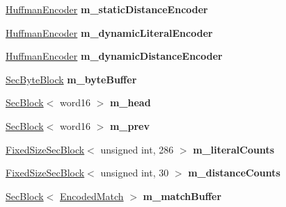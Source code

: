 \begin{DoxyCompactItemize}
\item 
\hypertarget{class_deflator_a3ca3308982b779fb60d9d3b6b10f0d02}{
\hyperlink{class_huffman_encoder}{HuffmanEncoder} {\bfseries m\_\-staticDistanceEncoder}}
\label{class_deflator_a3ca3308982b779fb60d9d3b6b10f0d02}

\item 
\hypertarget{class_deflator_a7234c528fbdceb1172e2036b9403e1eb}{
\hyperlink{class_huffman_encoder}{HuffmanEncoder} {\bfseries m\_\-dynamicLiteralEncoder}}
\label{class_deflator_a7234c528fbdceb1172e2036b9403e1eb}

\item 
\hypertarget{class_deflator_adea006b691879556c2e95d29743a57e3}{
\hyperlink{class_huffman_encoder}{HuffmanEncoder} {\bfseries m\_\-dynamicDistanceEncoder}}
\label{class_deflator_adea006b691879556c2e95d29743a57e3}

\item 
\hypertarget{class_deflator_a3d899c14cdac6972d8128c32befe3c1a}{
\hyperlink{class_sec_block}{SecByteBlock} {\bfseries m\_\-byteBuffer}}
\label{class_deflator_a3d899c14cdac6972d8128c32befe3c1a}

\item 
\hypertarget{class_deflator_ae72ff240bd264f77f2099c71966fdbf5}{
\hyperlink{class_sec_block}{SecBlock}$<$ word16 $>$ {\bfseries m\_\-head}}
\label{class_deflator_ae72ff240bd264f77f2099c71966fdbf5}

\item 
\hypertarget{class_deflator_aad7bfe8bebc06108c48f08d96e1f88f2}{
\hyperlink{class_sec_block}{SecBlock}$<$ word16 $>$ {\bfseries m\_\-prev}}
\label{class_deflator_aad7bfe8bebc06108c48f08d96e1f88f2}

\item 
\hypertarget{class_deflator_a9cb0dcdc269ae9336134c259882db3bb}{
\hyperlink{class_fixed_size_sec_block}{FixedSizeSecBlock}$<$ unsigned int, 286 $>$ {\bfseries m\_\-literalCounts}}
\label{class_deflator_a9cb0dcdc269ae9336134c259882db3bb}

\item 
\hypertarget{class_deflator_acf02ffb8290a1512da88d94d5e46369c}{
\hyperlink{class_fixed_size_sec_block}{FixedSizeSecBlock}$<$ unsigned int, 30 $>$ {\bfseries m\_\-distanceCounts}}
\label{class_deflator_acf02ffb8290a1512da88d94d5e46369c}

\item 
\hypertarget{class_deflator_a6e0546190e94863417f0ad86bf91834e}{
\hyperlink{class_sec_block}{SecBlock}$<$ \hyperlink{struct_deflator_1_1_encoded_match}{EncodedMatch} $>$ {\bfseries m\_\-matchBuffer}}
\label{class_deflator_a6e0546190e94863417f0ad86bf91834e}


\end{DoxyCompactItemize}
